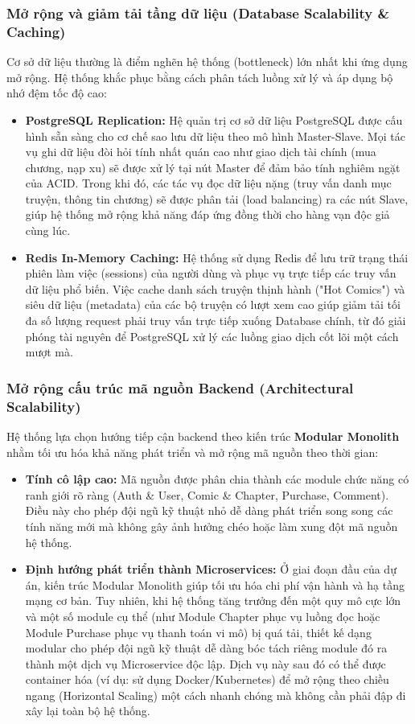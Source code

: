 \subsubsection{Mở rộng và giảm tải tầng dữ liệu (Database Scalability \& Caching)}
Cơ sở dữ liệu thường là điểm nghẽn hệ thống (bottleneck) lớn nhất khi ứng dụng mở rộng. Hệ thống khắc phục bằng cách phân tách luồng xử lý và áp dụng bộ nhớ đệm tốc độ cao:
\begin{itemize}
    \item \textbf{PostgreSQL Replication:} Hệ quản trị cơ sở dữ liệu PostgreSQL được cấu hình sẵn sàng cho cơ chế sao lưu dữ liệu theo mô hình Master-Slave. Mọi tác vụ ghi dữ liệu đòi hỏi tính nhất quán cao như giao dịch tài chính (mua chương, nạp xu) sẽ được xử lý tại nút Master để đảm bảo tính nghiêm ngặt của ACID. Trong khi đó, các tác vụ đọc dữ liệu nặng (truy vấn danh mục truyện, thông tin chương) sẽ được phân tải (load balancing) ra các nút Slave, giúp hệ thống mở rộng khả năng đáp ứng đồng thời cho hàng vạn độc giả cùng lúc.
    \item \textbf{Redis In-Memory Caching:} Hệ thống sử dụng Redis để lưu trữ trạng thái phiên làm việc (sessions) của người dùng và phục vụ trực tiếp các truy vấn dữ liệu phổ biến. Việc cache danh sách truyện thịnh hành ("Hot Comics") và siêu dữ liệu (metadata) của các bộ truyện có lượt xem cao giúp giảm tải tối đa số lượng request phải truy vấn trực tiếp xuống Database chính, từ đó giải phóng tài nguyên để PostgreSQL xử lý các luồng giao dịch cốt lõi một cách mượt mà.
\end{itemize}

\subsubsection{Mở rộng cấu trúc mã nguồn Backend (Architectural Scalability)}
Hệ thống lựa chọn hướng tiếp cận backend theo kiến trúc \textbf{Modular Monolith} nhằm tối ưu hóa khả năng phát triển và mở rộng mã nguồn theo thời gian:
\begin{itemize}
    \item \textbf{Tính cô lập cao:} Mã nguồn được phân chia thành các module chức năng có ranh giới rõ ràng (Auth \& User, Comic \& Chapter, Purchase, Comment). Điều này cho phép đội ngũ kỹ thuật nhỏ dễ dàng phát triển song song các tính năng mới mà không gây ảnh hưởng chéo hoặc làm xung đột mã nguồn hệ thống.
    \item \textbf{Định hướng phát triển thành Microservices:} Ở giai đoạn đầu của dự án, kiến trúc Modular Monolith giúp tối ưu hóa chi phí vận hành và hạ tầng mạng cơ bản. Tuy nhiên, khi hệ thống tăng trưởng đến một quy mô cực lớn và một số module cụ thể (như Module Chapter phục vụ luồng đọc hoặc Module Purchase phục vụ thanh toán vi mô) bị quá tải, thiết kế dạng modular cho phép đội ngũ kỹ thuật dễ dàng bóc tách riêng module đó ra thành một dịch vụ Microservice độc lập. Dịch vụ này sau đó có thể được container hóa (ví dụ: sử dụng Docker/Kubernetes) để mở rộng theo chiều ngang (Horizontal Scaling) một cách nhanh chóng mà không cần phải đập đi xây lại toàn bộ hệ thống.
\end{itemize}
